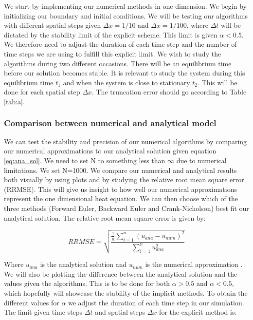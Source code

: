 \documentclass{article}
\begin{document}
\begin{multicols}{2}
We start by implementing our numerical methods in one dimension. We begin by initializing our boundary and initial conditions. We will be testing our algorithms with different spatial steps given $\Delta x =1/10$ and $\Delta x = 1/100$, where $\Delta t$ will be dictated by the stability limit of the explicit scheme. This limit is given $\alpha<0.5$. We therefore need to adjust the duration of each time step and the number of time steps we are using to fulfill this explicit limit. We wish to study the algorithms during two different occasions. There will be an equilibrium time before our solution becomes stable. It is relevant to study the system during this equilibrium time $t_1$ and when the system is close to stationary $t_2$. This will be done for each spatial step $\Delta x$. The truncation error should go according to Table \ref{tab:a}.

\subsubsection{Comparison between numerical and analytical model}

We can test the stability and precision of our numerical algorithms by comparing our numerical approximations to our analytical solution given equation \ref{eq:ana_sol}. We need to set N to something less than $\infty$ due to numerical limitations. We set N=1000. We compare our numerical and analytical results both visually by using plots and by studying the relative root mean square error (RRMSE). This will give us insight to how well our numerical approximations represent the one dimensional heat equation. We can then choose which of the three methods (Forward Euler, Backward Euler and Crank-Nicholson) best fit our analytical solution. The relative root mean square error is given by:

\begin{equation}
RRMSE = \sqrt{\frac{\frac{1}{n}\sum_{i=1}^n(u_{ana}-u_{num})^2}{\sum_{i=1}^n u_{ana}^2}}
\end{equation}

Where $u_{ana}$ is the analytical solution and $u_{num}$ is the numerical approximation \cite{97}. We will also be plotting the difference between the analytical solution and the values given the algorithms. This is to be done for both $\alpha>0.5$ and $\alpha<0.5$, which hopefully will showcase the stability of the implicit methods. To obtain the different values for $\alpha$ we adjust the duration of each time step in our simulation. The limit given time steps $\Delta t$ and spatial steps $\Delta x$ for the explicit method is:


\end{multicols}
\end{document}
